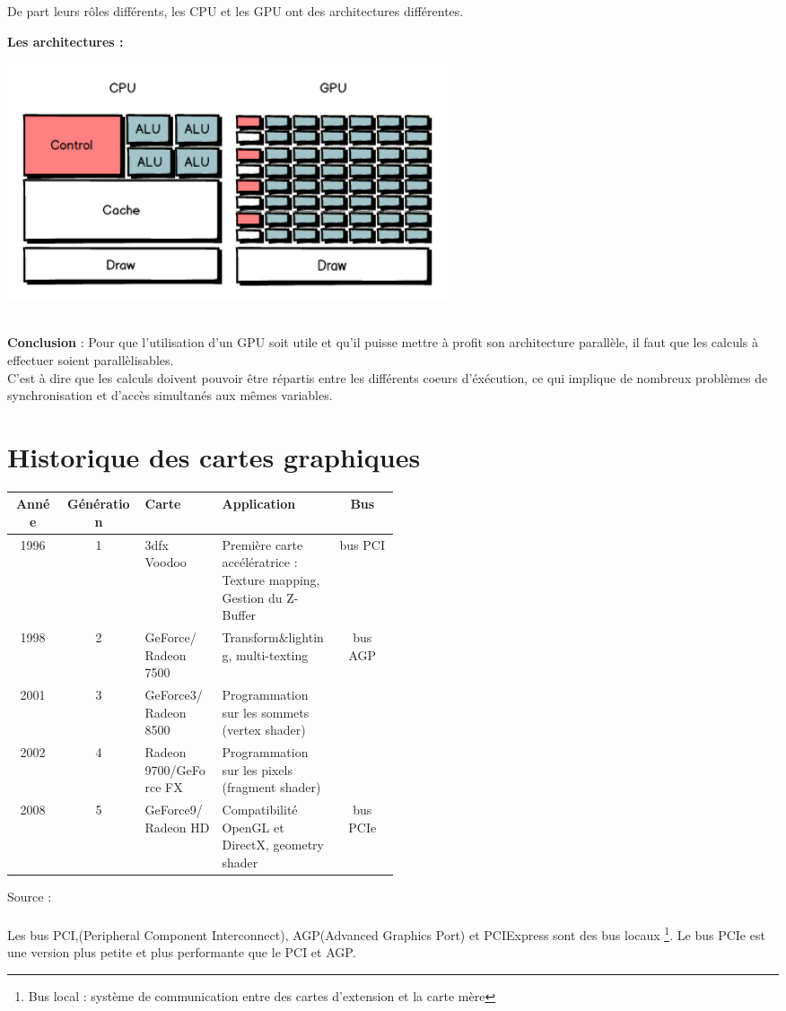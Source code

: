 De part leurs rôles différents, les CPU et les GPU ont des architectures différentes.

\newpage
\textbf{Les architectures :}
\begin{center}
\includegraphics[width=13cm]{pipeline/images/GPUCPU.png}
\end{center}

\textbf{\\Conclusion} : Pour que l’utilisation d’un GPU soit utile et qu'il puisse mettre à profit son architecture parallèle, il faut que les calculs à effectuer soient parallèlisables.\\
C'est à dire que les calculs doivent pouvoir être répartis entre les différents coeurs d'éxécution, ce qui implique de nombreux problèmes de synchronisation et d'accès simultanés aux mêmes variables.%



\section{Historique des cartes graphiques}
\begin{center}
\begin{tabular}{|c|c|m{0.2\linewidth}|m{0.3\linewidth} |c|}
\hline
Année & Génération & Carte & Application & Bus \\
\hline
1996 & 1 & 3dfx Voodoo & Première carte accélératrice : Texture mapping, Gestion du Z-Buffer & bus PCI\\
\hline
1998 & 2 & GeForce/ Radeon 7500 & Transform\&lighting, multi-texting & bus AGP \\
\cline{1-4}
2001 & 3 & GeForce3/ Radeon 8500 & Programmation sur les sommets (vertex shader)	& \\
\cline{1-4}
2002 & 4 & Radeon 9700/GeForce FX & Programmation sur les pixels (fragment shader)	& \\
\hline
2008 & 5 & GeForce9/ Radeon HD & Compatibilité OpenGL et DirectX,  geometry shader & bus PCIe \\
\hline
\end{tabular}
\end{center}

Source : \cite{historiqueCarte}
\\\\
Les bus PCI,(Peripheral Component Interconnect), AGP(Advanced Graphics Port) et PCIExpress sont des bus locaux
\footnote{ Bus local : système de communication entre des cartes d’extension et la carte mère}.
Le bus PCIe est une version plus petite et plus performante que le PCI et AGP.
